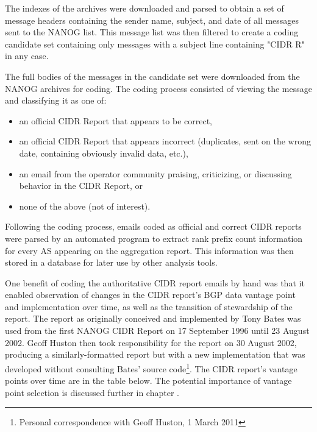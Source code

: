The indexes of the archives were downloaded and parsed to obtain a set of message headers containing the sender name, subject, and date of all messages sent to the NANOG list. This message list was then filtered to create a coding candidate set containing only messages with a subject line containing "CIDR R" in any case.

The full bodies of the messages in the candidate set were downloaded from the NANOG archives for coding. The coding process consisted of viewing the message and classifying it as one of:

\begin{itemize}
\item{an official CIDR Report that appears to be correct,}
\item{an official CIDR Report that appears incorrect (duplicates, sent on the wrong date, containing obviously invalid data, etc.),}
\item{an email from the operator community praising, criticizing, or discussing behavior in the CIDR Report, or}
\item{none of the above (not of interest).}
\end{itemize}

Following the coding process, emails coded as official and correct CIDR reports were parsed by an automated program to extract rank prefix count information for every AS appearing on the aggregation report. This information was then stored in a database for later use by other analysis tools.

One benefit of coding the authoritative CIDR report emails by hand was that it enabled observation of changes in the CIDR report's BGP data vantage point and implementation over time, as well as the transition of stewardship of the report. The report as originally conceived and implemented by Tony Bates was used from the first NANOG CIDR Report on 17 September 1996 until 23 August 2002. Geoff Huston then took responsibility for the report on 30 August 2002, producing a similarly-formatted report but with a new implementation that was developed without consulting Bates' source code\footnote{Personal correspondence with Geoff Huston, 1 March 2011}. The CIDR report's vantage points over time are in the table below. The potential importance of vantage point selection is discussed further in chapter .

